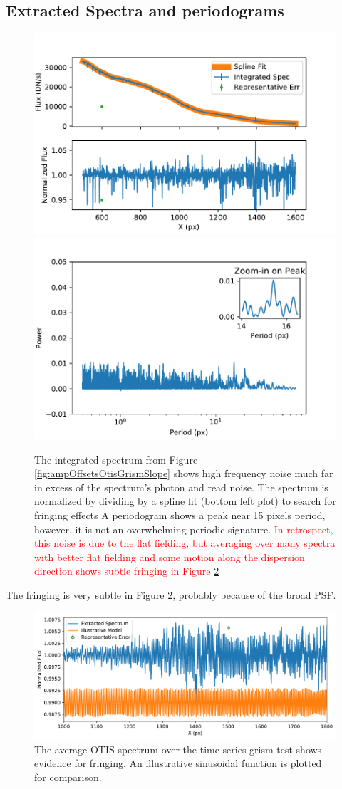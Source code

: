\documentclass{aastex62}
\begin{document}
\subsection{Extracted Spectra and periodograms}


\begin{figure}[!hbtp]
\centering
\includegraphics[width=.49\columnwidth]{otis_spec_and_norm.pdf}
\includegraphics[width=.49\columnwidth]{otis_spec_periodogram.pdf}
\caption{The integrated spectrum from Figure \ref{fig:ampOffsetsOtisGrismSlope} shows high frequency noise much far in excess of the spectrum's photon and read noise.
The spectrum is normalized by dividing by a spline fit (bottom left plot) to search for fringing effects
A periodogram shows a peak near 15 pixels period, however, it is not an overwhelming periodic signature.
\textcolor{red}{In retrospect, this noise is due to the flat fielding, but averaging over many spectra with better flat fielding and some motion along the dispersion direction shows subtle fringing in Figure \ref{fig:avgOtisGrismSpecFringing}}
}\label{fig:integratedOtisGrismSpec}
\end{figure}

The fringing is very subtle in Figure \ref{fig:avgOtisGrismSpecFringing}, probably because of the broad PSF.

\begin{figure}[!hbtp]
\centering
\includegraphics[width=.99\columnwidth]{fringing_grism_otis.pdf}
\caption{The average OTIS spectrum over the time series grism test shows evidence for fringing.
An illustrative sinusoidal function is plotted for comparison.
}\label{fig:avgOtisGrismSpecFringing}
\end{figure}
\end{document}
